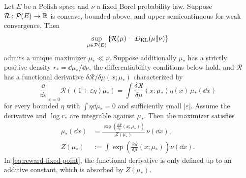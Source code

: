 \documentclass[12pt,a4paper,oneside]{book}
\begin{document}
\begin{theorem}
\label{thm:reward-guided-tilt}
\label{src:p11q13}
Let $E$ be a Polish space and $\nu$ a fixed Borel probability law. Suppose $\mathcal R:\mathcal P(E)\to\mathbb{R}$ is concave, 
bounded above, and upper semicontinuous for weak convergence. Then
\begin{equation*}
    \sup_{\mu\in\mathcal P(E)}\left\{\mathcal R(\mu)-D_{\mathrm{KL}}(\mu\Vert\nu)\right\}
\end{equation*}
admits a unique maximizer $\mu_*\ll\nu$. Suppose additionally $\mu_*$ has a strictly positive density $r_*=\dd\mu_*/\dd\nu$, 
the differentiability conditions below hold, and $\mathcal R$ has a functional derivative $\delta\mathcal R/\delta\mu(x;\mu_*)$ 
characterized by
\begin{equation*}
    \left.\frac{\dd}{\dd\varepsilon}\right|_{\varepsilon=0}
    \mathcal R((1+\varepsilon \eta)\mu_*)
    =\int\frac{\delta\mathcal R}{\delta\mu}(x;\mu_*)\eta(x)\,\mu_*(\dd x)
\end{equation*}
for every bounded $\eta$ with $\int \eta\dd\mu_*=0$ and sufficiently small $|\varepsilon|$. Assume the derivative and $\log r_*$
are integrable against $\mu_*$. Then the maximizer satisfies
\begin{equation}
    \begin{aligned}
        \mu_*(\dd x) &=\frac{\exp\!
                \left(
                    \frac{\delta\mathcal R}{\delta\mu}(x;\mu_*)
                \right)
            }{
                Z(\mu_*)
        }\,\nu(\dd x),\\
        Z(\mu_*)&:=\int\exp\!\left(
        \frac{\delta\mathcal R}{\delta\mu}(x;\mu_*)\right)\nu(\dd x).
    \end{aligned}
    \label{eq:reward-fixed-point}
\end{equation}
In \eqref{eq:reward-fixed-point}, the functional derivative is only defined up to an additive constant, which is absorbed 
by $Z(\mu_*)$.
\end{theorem}
\end{document}
